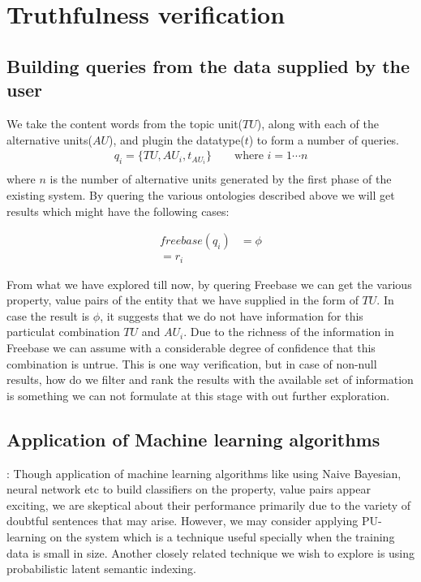 \documentclass[11pt]{article}
\begin{document}
\section{Truthfulness verification }
\subsection {Building queries from the data supplied by the user}

We take the content words from the topic unit($TU$), along with each of the
alternative units($AU$), and plugin the datatype($t$) to form a number of
queries.
\begin{align*}
q_{i} = \{{TU, AU_{i}, t_{AU_{i}}} \} \qquad \mbox {where $i = 1 \cdots n$} \\
\end{align*}
where $n$ is the number of alternative units generated by the first phase of
the existing system. By quering the various ontologies described above we will
get results which might have the following cases:

\begin{align*}
   freebase(q_{i}) &= \phi \\
    = r_{i}
\end{align*}

From what we have explored till now, by quering Freebase we can get the
various property, value pairs of the entity that we have supplied in the form
of $TU$. In case the result is $\phi$, it suggests that we do not have
information for this particulat combination $TU$ and $AU_{i}$. Due to the
richness of the information in Freebase we can assume with a considerable degree of confidence
that this combination is untrue. This is one way verification, but in case of
non-null results, how do we filter and rank the results with the available set
of information is something we can not formulate at this stage with out further
exploration.



\subsection{Application of Machine learning algorithms}: 
Though application of machine learning algorithms like using Naive Bayesian,
neural network etc to build classifiers on the property, value pairs appear
exciting, we are skeptical about their performance primarily due to the variety
of doubtful sentences that may arise. However, we may consider
applying PU-learning on the system which is a technique useful specially when
the training data is small in size. Another closely related technique we wish to
explore is using probabilistic latent semantic indexing.

%

\end{document}

